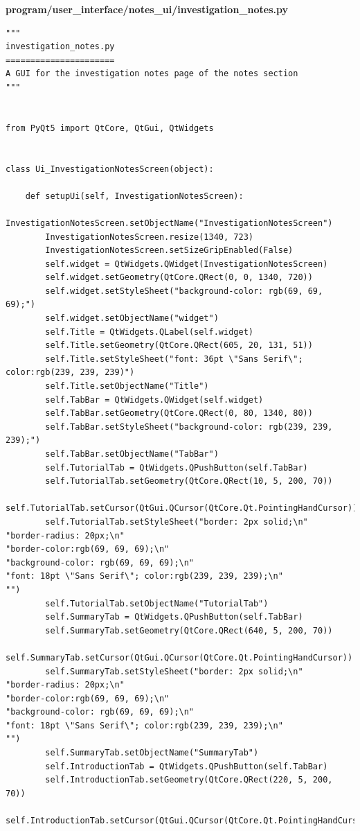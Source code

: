 \documentclass{article}
\begin{document}
\textbf{program/user\_interface/notes\_ui/investigation\_notes.py}

\begin{lstlisting}
"""
investigation_notes.py
======================
A GUI for the investigation notes page of the notes section
"""


from PyQt5 import QtCore, QtGui, QtWidgets


class Ui_InvestigationNotesScreen(object):

    def setupUi(self, InvestigationNotesScreen):
        InvestigationNotesScreen.setObjectName("InvestigationNotesScreen")
        InvestigationNotesScreen.resize(1340, 723)
        InvestigationNotesScreen.setSizeGripEnabled(False)
        self.widget = QtWidgets.QWidget(InvestigationNotesScreen)
        self.widget.setGeometry(QtCore.QRect(0, 0, 1340, 720))
        self.widget.setStyleSheet("background-color: rgb(69, 69, 69);")
        self.widget.setObjectName("widget")
        self.Title = QtWidgets.QLabel(self.widget)
        self.Title.setGeometry(QtCore.QRect(605, 20, 131, 51))
        self.Title.setStyleSheet("font: 36pt \"Sans Serif\"; color:rgb(239, 239, 239)")
        self.Title.setObjectName("Title")
        self.TabBar = QtWidgets.QWidget(self.widget)
        self.TabBar.setGeometry(QtCore.QRect(0, 80, 1340, 80))
        self.TabBar.setStyleSheet("background-color: rgb(239, 239, 239);")
        self.TabBar.setObjectName("TabBar")
        self.TutorialTab = QtWidgets.QPushButton(self.TabBar)
        self.TutorialTab.setGeometry(QtCore.QRect(10, 5, 200, 70))
        self.TutorialTab.setCursor(QtGui.QCursor(QtCore.Qt.PointingHandCursor))
        self.TutorialTab.setStyleSheet("border: 2px solid;\n"
"border-radius: 20px;\n"
"border-color:rgb(69, 69, 69);\n"
"background-color: rgb(69, 69, 69);\n"
"font: 18pt \"Sans Serif\"; color:rgb(239, 239, 239);\n"
"")
        self.TutorialTab.setObjectName("TutorialTab")
        self.SummaryTab = QtWidgets.QPushButton(self.TabBar)
        self.SummaryTab.setGeometry(QtCore.QRect(640, 5, 200, 70))
        self.SummaryTab.setCursor(QtGui.QCursor(QtCore.Qt.PointingHandCursor))
        self.SummaryTab.setStyleSheet("border: 2px solid;\n"
"border-radius: 20px;\n"
"border-color:rgb(69, 69, 69);\n"
"background-color: rgb(69, 69, 69);\n"
"font: 18pt \"Sans Serif\"; color:rgb(239, 239, 239);\n"
"")
        self.SummaryTab.setObjectName("SummaryTab")
        self.IntroductionTab = QtWidgets.QPushButton(self.TabBar)
        self.IntroductionTab.setGeometry(QtCore.QRect(220, 5, 200, 70))
        self.IntroductionTab.setCursor(QtGui.QCursor(QtCore.Qt.PointingHandCursor))

\end{lstlisting}
\end{document}
